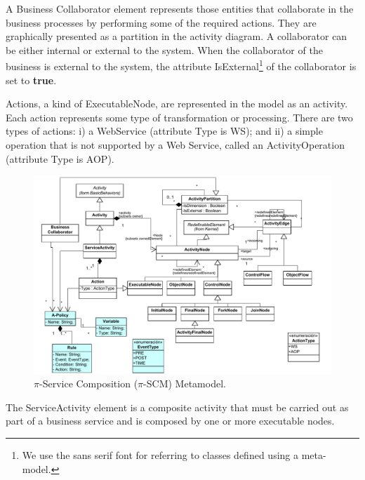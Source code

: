 \begin{itemizedTrivlist}
\item A {\sc Business Collaborator} element represents those entities that collaborate in the business processes by performing some of the required actions. 
They are graphically presented as a partition in the activity diagram. 
A collaborator can be either internal or external to the system. 
When the collaborator of the business is external to the system, the attribute {\sf IsExternal}\footnote{We use the {\sf sans serif} font for referring to classes defined using a meta-model.} of the collaborator is set to \textbf{true}.

\item {\sc Action}s, a kind of {\sc ExecutableNode}, are represented in the model as an activity. 
Each action represents some type of transformation or processing. 
There are two types of actions: i) a WebService (attribute Type is {\sf WS}); and ii) a simple operation that is not supported by a Web Service, called an {\sc ActivityOperation} (attribute Type is {\sc AOP}).
\begin{figure}[t]
\centering
\includegraphics[width=1.0\textwidth]{figs/E-service-composition-metamodel}
\caption{$\pi$-Service Composition ($\pi$-SCM) Metamodel.}
\label{fig:e-scomposition-metamodel}
\end{figure}

\item The {\sc ServiceActivity} element is a composite activity that must be carried out as part of a business service and is composed by one or more executable nodes.


\end{itemizedTrivlist}
